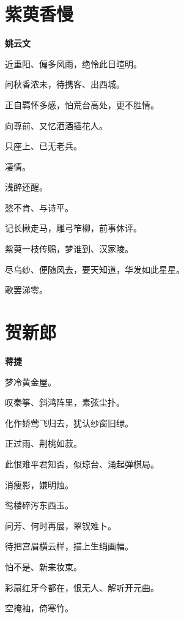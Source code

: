 \documentclass[12pt,a4paper]{ctexbook}
\begin{document}
\section{紫萸香慢}
\textbf{姚云文}\par\vspace{0.5em}
近重阳、偏多风雨，绝怜此日暄明。\par
问秋香浓未，待携客、出西城。\par
正自羁怀多感，怕荒台高处，更不胜情。\par
向尊前、又忆洒酒插花人。\par
只座上、已无老兵。\par
凄情。\par
浅醉还醒。\par
愁不肯、与诗平。\par
记长楸走马，雕弓笮柳，前事休评。\par
紫萸一枝传赐，梦谁到、汉家陵。\par
尽乌纱、便随风去，要天知道，华发如此星星。\par
歌罢涕零。\par

\section{贺新郎}
\textbf{蒋捷}\par\vspace{0.5em}
梦冷黄金屋。\par
叹秦筝、斜鸿阵里，素弦尘扑。\par
化作娇莺飞归去，犹认纱窗旧绿。\par
正过雨、荆桃如菽。\par
此恨难平君知否，似琼台、涌起弹棋局。\par
消瘦影，嫌明烛。\par
鸳楼碎泻东西玉。\par
问芳、何时再展，翠钗难卜。\par
待把宫眉横云样，描上生绡画幅。\par
怕不是、新来妆束。\par
彩扇红牙今都在，恨无人、解听开元曲。\par
空掩袖，倚寒竹。\par
\end{document}
